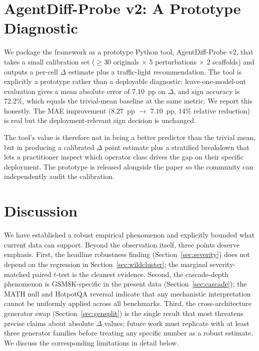 \documentclass[11pt]{article}
\begin{document}
\section{AgentDiff-Probe v2: A Prototype Diagnostic}
\label{sec:probe}

We package the framework as a prototype Python tool, AgentDiff-Probe v2, that takes a small calibration set ($\geq 30$ originals $\times$ 5 perturbations $\times$ 2 scaffolds) and outputs a per-cell $\Delta$ estimate plus a traffic-light recommendation. The tool is explicitly a prototype rather than a deployable diagnostic: leave-one-model-out evaluation gives a mean absolute error of $7.10$~pp on $\Delta$, and sign accuracy is $72.2\%$, which equals the trivial-mean baseline at the same metric. We report this honestly. The MAE improvement ($8.27$~pp $\rightarrow$ $7.10$~pp, $14\%$ relative reduction) is real but the deployment-relevant sign decision is unchanged.

The tool's value is therefore not in being a better predictor than the trivial mean, but in producing a calibrated $\Delta$ point estimate plus a stratified breakdown that lets a practitioner inspect which operator class drives the gap on their specific deployment. The prototype is released alongside the paper so the community can independently audit the calibration.

\section{Discussion}
\label{sec:discussion}

We have established a robust empirical phenomenon and explicitly bounded what current data can support. Beyond the observation itself, three points deserve emphasis. First, the headline robustness finding (Section~\ref{sec:severity}) does not depend on the regression in Section~\ref{sec:wildcluster}; the marginal severity-matched paired $t$-test is the cleanest evidence. Second, the cascade-depth phenomenon is GSM8K-specific in the present data (Section~\ref{sec:cascade}); the MATH null and HotpotQA reversal indicate that any mechanistic interpretation cannot be uniformly applied across all benchmarks. Third, the cross-architecture generator swap (Section~\ref{sec:gensplit}) is the single result that most threatens precise claims about absolute $\Delta$ values; future work must replicate with at least three generator families before treating any specific number as a robust estimate. We discuss the corresponding limitations in detail below.
\end{document}
